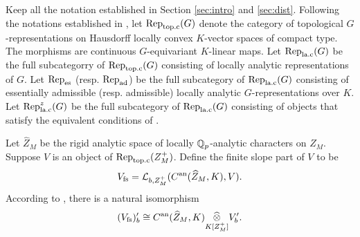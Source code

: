 \documentclass[10pt]{amsart}
\begin{document}

Keep all the notation established in Section \ref{sec:intro} and \ref{sec:dist}. Following the notations established in \cite{Jacquet1}, let $\textnormal{Rep}_{\textnormal{top.c}}(G)$ denote the category of topological $G$-representations on Hausdorff locally convex $K$-vector spaces of compact type. The morphisms are continuous $G$-equivariant $K$-linear maps. Let $\textnormal{Rep}_{\textnormal{la.c}}(G)$ be the full subcategorry of $\textnormal{Rep}_{\textnormal{top.c}}(G)$ consisting of locally analytic representations of $G$. Let $\textnormal{Rep}_{\textnormal{es}}$ (resp. $\textnormal{Rep}_{\textnormal{ad}}$) be the full subcategory of $\textnormal{Rep}_{\textnormal{la.c}}(G)$ consisting of essentially admissible (resp. admissible) locally analytic $G$-representations over $K$. Let $\textnormal{Rep}_{\textnormal{la.c}}^{z}(G)$ be the full subcategory of $\textnormal{Rep}_{\textnormal{la.c}}(G)$ consisting of objects that satisfy the equivalent conditions of \cite[Prop. 6.4.7]{analytic}.


Let $\widehat{Z}_{M}$ be the rigid analytic space of locally $\mathbb{Q}_{p}$-analytic characters on $Z_{M}$. Suppose $V$ is an object of $\textnormal{Rep}_{\textnormal{top.c}}(Z_{M}^{+})$. Define the finite slope part of $V$ to be \[
    V_{\textnormal{fs}} = \mathcal{L}_{b,Z_{M}^{+}}(C^{\textnormal{an}}(\widehat{Z}_{M},K),V).
\] According to \cite[Lem. 3.2.3]{Jacquet1}, there is a natural isomorphism \begin{equation}\label{eqn:fs_dual}
    (V_{\textnormal{fs}})^{\prime}_{b}\cong C^{\textnormal{an}}(\widehat{Z}_{M},K)\underset{K[Z_{M}^{+}]}{\widehat{\otimes}} V^{\prime}_{b}.
\end{equation}


\end{document}

